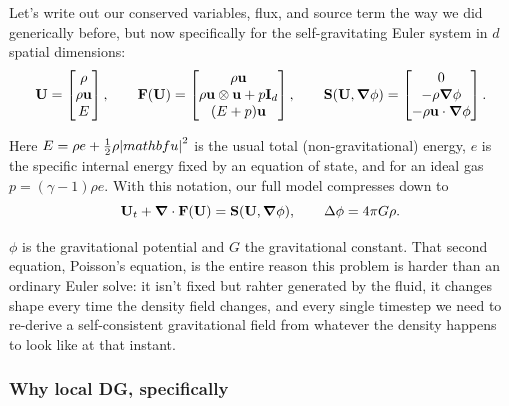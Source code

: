 Let's write out our conserved variables, flux, and source term the way we did generically before, but now specifically for the self-gravitating Euler system in $d$ spatial dimensions:
\[
	\mathbf{U} =
	\begin{bmatrix}
		\rho \\ \rho \mathbf{u} \\ E
	\end{bmatrix}, \qquad
	\mathbf{F}(\mathbf{U}) =
	\begin{bmatrix}
		\rho \mathbf{u} \\ \rho \mathbf{u}\otimes\mathbf{u} + p\mathbf{I}_d \\ (E+p)\mathbf{u}
	\end{bmatrix}, \qquad
	\mathbf{S}(\mathbf{U}, \grad\phi) =
	\begin{bmatrix}
		0 \\ -\rho\grad\phi \\ -\rho\mathbf{u}\cdot\grad\phi
	\end{bmatrix}.
\]

Here $E = \rho e + \tfrac12 \rho \abs{mathbf{u}}^2$ is the usual total (non-gravitational) energy, $e$ is the specific internal energy fixed by an equation of state, and for an ideal gas $p = (\gamma-1)\rho e$. With this notation, our full model compresses down to
\[
	\mathbf{U}_t + \grad\cdot\mathbf{F}(\mathbf{U}) = \mathbf{S}(\mathbf{U},\grad\phi), \qquad \Delta\phi = 4\pi G \rho.
\]

$\phi$ is the gravitational potential and $G$ the gravitational constant. That second equation, Poisson's equation, is the entire reason this problem is harder than an ordinary Euler solve: it isn't fixed but rahter generated by the fluid, it changes shape every time the density field changes, and every single timestep we need to re-derive a self-consistent gravitational field from whatever the density happens to look like at that instant.

\subsubsection{Why local DG, specifically}

